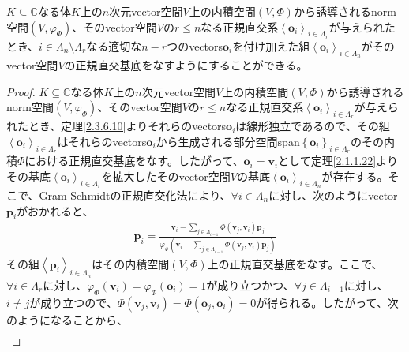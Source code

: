 \documentclass[dvipdfmx]{jsarticle}
\begin{document}
\begin{thm}\label{2.3.6.12}
$K \subseteq \mathbb{C}$なる体$K$上の$n$次元vector空間$V$上の内積空間$(V,\varPhi)$から誘導されるnorm空間$\left( V,\varphi_{\varPhi} \right)$、そのvector空間$V$の$r \leq n$なる正規直交系$\left\langle \mathbf{o}_{i} \right\rangle_{i \in \varLambda_{r}}$が与えられたとき、$i \in \varLambda_{n} \setminus \varLambda_{r}$なる適切な$n - r$つのvectors$\mathbf{o}_{i}$を付け加えた組$\left\langle \mathbf{o}_{i} \right\rangle_{i \in \varLambda_{n}}$がそのvector空間$V$の正規直交基底をなすようにすることができる。
\end{thm}
\begin{proof}
$K \subseteq \mathbb{C}$なる体$K$上の$n$次元vector空間$V$上の内積空間$(V,\varPhi)$から誘導されるnorm空間$\left( V,\varphi_{\varPhi} \right)$、そのvector空間$V$の$r \leq n$なる正規直交系$\left\langle \mathbf{o}_{i} \right\rangle_{i \in \varLambda_{r}}$が与えられたとき、定理\ref{2.3.6.10}よりそれらのvectors$\mathbf{o}_{i}$は線形独立であるので、その組$\left\langle \mathbf{o}_{i} \right\rangle_{i \in \varLambda_{r}}$はそれらのvectors$\mathbf{o}_{i}$から生成される部分空間$\mathrm{span}\left\{ \mathbf{o}_{i} \right\}_{i \in \varLambda_{r}}$のその内積$\varPhi$における正規直交基底をなす。したがって、$\mathbf{o}_{i} = \mathbf{v}_{i}$として定理\ref{2.1.1.22}よりその基底$\left\langle \mathbf{o}_{i} \right\rangle_{i \in \varLambda_{r}}$を拡大したそのvector空間$V$の基底$\left\langle \mathbf{o}_{i} \right\rangle_{i \in \varLambda_{n}}$が存在する。そこで、Gram-Schmidtの正規直交化法により、$\forall i \in \varLambda_{n}$に対し、次のようにvector$\mathbf{p}_{i}$がおかれると、
\begin{align*}
\mathbf{p}_{i} = \frac{\mathbf{v}_{i} - \sum_{j \in \varLambda_{i - 1}} {\varPhi\left( \mathbf{v}_{j},\mathbf{v}_{i} \right)\mathbf{p}_{j}}}{\varphi_{\varPhi}\left( \mathbf{v}_{i} - \sum_{j \in \varLambda_{i - 1}} {\varPhi\left( \mathbf{v}_{j},\mathbf{v}_{i} \right)\mathbf{p}_{j}} \right)}
\end{align*}
その組$\left\langle \mathbf{p}_{i} \right\rangle_{i \in \varLambda_{n}}$はその内積空間$(V,\varPhi)$上の正規直交基底をなす。ここで、$\forall i \in \varLambda_{r}$に対し、$\varphi_{\varPhi}\left( \mathbf{v}_{i} \right) = \varphi_{\varPhi}\left( \mathbf{o}_{i} \right) = 1$が成り立つかつ、$\forall j \in \varLambda_{i - 1}$に対し、$i \neq j$が成り立つので、$\varPhi\left( \mathbf{v}_{j},\mathbf{v}_{i} \right) = \varPhi\left( \mathbf{o}_{j},\mathbf{o}_{i} \right) = 0$が得られる。したがって、次のようになることから、
\begin{align*}

\end{align*}
\end{proof}
\end{document}
